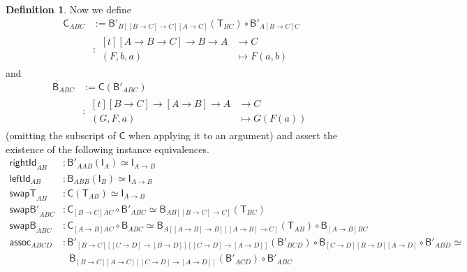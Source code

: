 \documentclass[a4paper]{article}
\theoremstyle{definition}
\newtheorem{definition}{Definition}[section]
\theoremstyle{remark}
\renewcommand{\equiv}{\simeq}
\newcommand{\nm}{\mathsf}
\newcommand{\combinator}{\nm}
\newcommand{\idFun}{\combinator{I}}
\newcommand{\revAppFun}{\combinator{T}}
\newcommand{\compFun}{\combinator{B'}}
\newcommand{\revCompFun}{\combinator{B}}
\newcommand{\swapFun}{\combinator{C}}
\begin{document}
\begin{definition}
  Now we define
  \begin{align*}
    \swapFun_{ABC} &:= \compFun_{B[[B{\to}C]{\to}C][A{\to}C]}(\revAppFun_{BC}) \circ \compFun_{A[B{\to}C]C}\\
                   &: \begin{aligned}[t]
                        [A \to B \to C] \to B \to A &\to     C\\
                        (F,b,a)                     &\mapsto F(a,b)
                      \end{aligned}
  \end{align*}
  and
  \begin{align*}
    \revCompFun_{ABC} &:= \swapFun(\compFun_{ABC})\\
                      &: \begin{aligned}[t]
                           [B \to C] \to [A \to B] \to A &\to     C\\
                           (G,F,a)                       &\mapsto G(F(a))
                         \end{aligned}
  \end{align*}
  (omitting the subscript of $\swapFun$ when applying it to an argument)
  and assert the existence of the following instance equivalences.
  \begin{align*}
    \nm{rightId}_{AB} &: \compFun_{AAB}(\idFun_A) \equiv \idFun_{A{\to}B}\\
    \nm{leftId}_{AB}  &: \revCompFun_{ABB}(\idFun_B) \equiv \idFun_{A{\to}B}\\
    \nm{swapT}_{AB}   &: \swapFun(\revAppFun_{AB}) \equiv \idFun_{A{\to}B}\\
    \nm{swapB'}_{ABC} &: \swapFun_{[B{\to}C]AC} \circ \compFun_{ABC} \equiv \revCompFun_{AB[[B{\to}C]{\to}C]}(\revAppFun_{BC})\\
    \nm{swapB}_{ABC}  &: \swapFun_{[A{\to}B]AC} \circ \revCompFun_{ABC} \equiv \revCompFun_{A[[A{\to}B]{\to}B][[A{\to}B]{\to}C]}(\revAppFun_{AB}) \circ \revCompFun_{[A{\to}B]BC}\\
    \nm{assoc}_{ABCD} &: \compFun_{[B{\to}C][[C{\to}D]{\to}[B{\to}D]][[C{\to}D]{\to}[A{\to}D]]}(\compFun_{BCD}) \circ \revCompFun_{[C{\to}D][B{\to}D][A{\to}D]} \circ \compFun_{ABD} \equiv\\
                      &\:\ \ \revCompFun_{[B{\to}C][A{\to}C][[C{\to}D]{\to}[A{\to}D]]}(\compFun_{ACD}) \circ \compFun_{ABC}
  \end{align*}
\end{definition}
\end{document}
